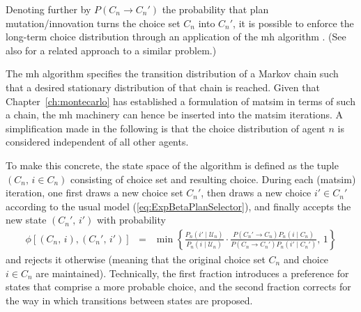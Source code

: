 Denoting further by $P(C_{n}\rightarrow C_{n}')$ the probability
that plan mutation/innovation turns the choice set $C_{n}$ into $C_{n}'$,
it is possible to enforce the long-term choice distribution 
through an application of the \gls{mh} algorithm \citep{hastings-1970}.
(See also \citet{floetteroed-2012b} for a related approach to a similar
problem.) 

The \gls{mh} algorithm specifies the transition distribution
of a Markov chain such that a desired stationary distribution of that
chain is reached. Given that Chapter~\ref{ch:montecarlo} has established
a formulation of \gls{matsim} in terms of such a chain, the \gls{mh} machinery can
hence be inserted into the \gls{matsim} iterations. A simplification made in
the following is that the choice distribution of agent $n$ is considered
independent of all other agents.

To make this concrete, the state space of the algorithm is defined as the tuple
$(C_{n},\, i\in C_{n})$ consisting of choice set and resulting choice.
During each (\gls{matsim}) iteration, one first draws a new choice set $C_{n}'$,
then draws a new choice $i'\in C_{n}'$ according to the usual model (\ref{eq:ExpBetaPlanSelector}), 
and finally accepts the new state $(C_{n}',\, i')$ with probability
\begin{eqnarray}
\phi[(C_{n},\, i),(C_{n}',\, i')] 
& = & 
\min\left\{ 
\frac{{\displaystyle P_{n}(i'\mid \mathcal{U}_n)}}
{{\displaystyle P_{n}(i\mid \mathcal{U}_n)}}
\cdot
\frac{{P(C_{n}'\rightarrow C_{n})P_n(i\mid C_{n})}}
{{P(C_{n}\rightarrow C_{n}')P_n(i'\mid C_{n}')}}
,\,1\right\} 
\label{eq:accept-proba-1}
\end{eqnarray}
and rejects it otherwise (meaning that the original choice set $C_{n}$
and choice $i\in C_{n}$ are maintained).
Technically, the first fraction introduces a preference for states
that comprise a more probable choice, and the second
fraction corrects for the way in which transitions between states are
proposed.


